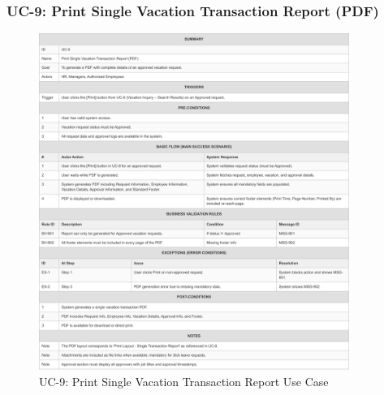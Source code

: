 \documentclass[12pt,a4paper]{article}
\begin{document}
\subsubsection{UC-9: Print Single Vacation Transaction Report (PDF)}
\begin{figure}[H]
\centering
\includegraphics[width=0.9\textwidth]{Use-Cases/UC-9-Print-Single-Vacation-Transaction-Report/UC-9-Print-Single-Vacation-Transaction-Report-1.png}
\caption{UC-9: Print Single Vacation Transaction Report Use Case}
\label{fig:uc9}
\end{figure}
\end{document}
